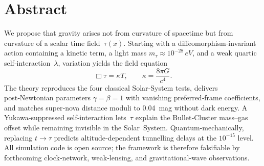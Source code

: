 \chapter*{Abstract}
We propose that gravity arises not from curvature of spacetime but from curvature of a scalar time field~$\tau(x)$. 
Starting with a diffeomorphism‑invariant action containing a kinetic term, a light mass $m_\tau\approx10^{-28}\,\si{eV}$, 
and a weak quartic self‑interaction~$\lambda$, variation yields the field equation
\begin{equation}
  \Box\tau=\kappa T,\qquad \kappa=\frac{8\pi G}{c^{4}}.
\end{equation}
The theory reproduces the four classical Solar‑System tests, delivers post‑Newtonian parameters 
$\gamma=\beta=1$ with vanishing preferred‑frame coefficients, and matches super‑nova distance moduli to 
\SI{0.04}{mag} without dark energy. A Yukawa‑suppressed self‑interaction lets~$\tau$ explain the Bullet‑Cluster 
mass–gas offset while remaining invisible in the Solar System. Quantum‑mechanically, replacing $t\to\tau$ predicts
 altitude‑dependent tunnelling delays at the $10^{-15}$ level. All simulation code is open source; the framework is 
 therefore falsifiable by forthcoming clock‑network, weak‑lensing, and gravitational‑wave observations.